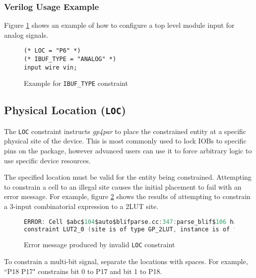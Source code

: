 \documentclass[11pt]{article}
\newcommand{\namestyle}[1]{\textit{#1}}
\newcommand{\tokenstyle}[1]{\texttt{#1}}
\begin{document}
\subsubsection{Verilog Usage Example}

Figure \ref{constraint-ibuftype} shows an example of how to configure a top level module input for analog signals.

\begin{figure}[h]
\begin{lstlisting}
(* LOC = "P6" *)
(* IBUF_TYPE = "ANALOG" *)
input wire vin;
\end{lstlisting}
\caption{Example for \tokenstyle{IBUF\_TYPE} constraint}
\label{constraint-ibuftype}
\end{figure}


\pagebreak
\subsection{Physical Location (\tokenstyle{LOC})}

The \tokenstyle{LOC} constraint instructs \namestyle{gp4par} to place the constrained entity at a specific physical
site of the device. This is most commonly used to lock IOBs to specific pins on the package, however advanced users can
use it to force arbitrary logic to use specific device resources.

The specified location must be valid for the entity being constrained. Attempting to constrain a cell to an illegal
site causes the initial placement to fail with an error message. For example, figure \ref{invalid-loc} shows the
results of attempting to constrain a 3-input combinatorial expression to a 2LUT site.

\begin{figure}[h]
\begin{lstlisting}[language=c]
ERROR: Cell $abc$104$auto$blifparse.cc:347:parse_blif$106 has invalid LOC
constraint LUT2_0 (site is of type GP_2LUT, instance is of type GP_3LUT)
\end{lstlisting}
\caption{Error message produced by invalid \tokenstyle{LOC} constraint}
\label{invalid-loc}
\end{figure}

To constrain a multi-bit signal, separate the locations with spaces. For example, ``P18 P17" constrains bit 0 to P17
and bit 1 to P18.
\end{document}
